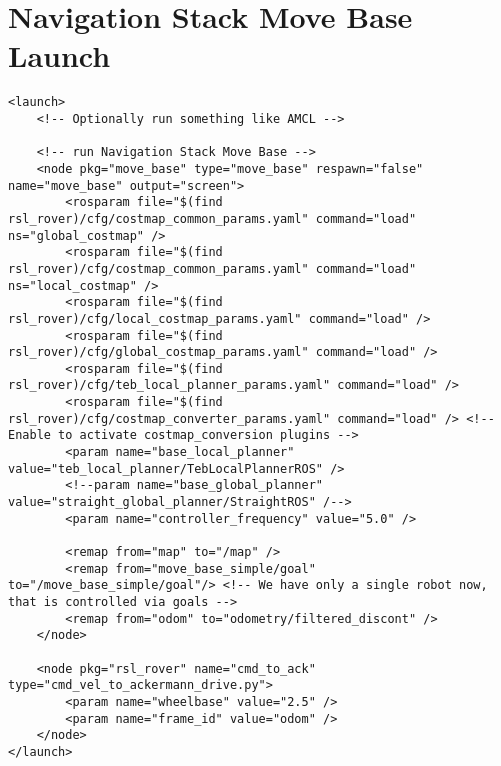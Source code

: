 \section*{Navigation Stack Move Base Launch}
\begin{lstlisting}[breaklines=true,basicstyle=\tiny]
<launch>
	<!-- Optionally run something like AMCL -->

	<!-- run Navigation Stack Move Base -->
  	<node pkg="move_base" type="move_base" respawn="false" name="move_base" output="screen">
	    <rosparam file="$(find rsl_rover)/cfg/costmap_common_params.yaml" command="load" ns="global_costmap" />
	    <rosparam file="$(find rsl_rover)/cfg/costmap_common_params.yaml" command="load" ns="local_costmap" />
	    <rosparam file="$(find rsl_rover)/cfg/local_costmap_params.yaml" command="load" />
	    <rosparam file="$(find rsl_rover)/cfg/global_costmap_params.yaml" command="load" />
	    <rosparam file="$(find rsl_rover)/cfg/teb_local_planner_params.yaml" command="load" />
	    <rosparam file="$(find rsl_rover)/cfg/costmap_converter_params.yaml" command="load" /> <!-- Enable to activate costmap_conversion plugins -->
	    <param name="base_local_planner" value="teb_local_planner/TebLocalPlannerROS" />
	    <!--param name="base_global_planner" value="straight_global_planner/StraightROS" /-->
	    <param name="controller_frequency" value="5.0" />

	    <remap from="map" to="/map" />
	    <remap from="move_base_simple/goal" to="/move_base_simple/goal"/> <!-- We have only a single robot now, that is controlled via goals -->
	    <remap from="odom" to="odometry/filtered_discont" />
 	</node>

	<node pkg="rsl_rover" name="cmd_to_ack" type="cmd_vel_to_ackermann_drive.py">
		<param name="wheelbase" value="2.5" />
		<param name="frame_id" value="odom" />
	</node>
</launch>

\end{lstlisting}




